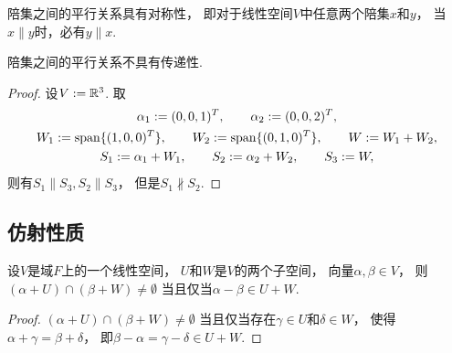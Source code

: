 \begin{property}
陪集之间的平行关系具有对称性，
即对于线性空间\(V\)中任意两个陪集\(x\)和\(y\)，
当\(x \parallel y\)时，必有\(y \parallel x\).
\end{property}

\begin{property}
陪集之间的平行关系不具有传递性.
\begin{proof}
设\(V := \mathbb{R}^3\).
取\begin{gather*}
	\alpha_1 := (0,0,1)^T,
	\qquad
	\alpha_2 := (0,0,2)^T, \\
	W_1 := \operatorname{span}\{(1,0,0)^T\},
	\qquad
	W_2 := \operatorname{span}\{(0,1,0)^T\},
	\qquad
	W := W_1 + W_2, \\
	S_1 := \alpha_1 + W_1,
	\qquad
	S_2 := \alpha_2 + W_2,
	\qquad
	S_3 := W,
\end{gather*}
则有\(
	S_1 \parallel S_3,
	S_2 \parallel S_3
\)，
但是\(S_1 \nparallel S_2\).
\end{proof}
\end{property}

\subsection{仿射性质}
\begin{theorem}\label{theorem:仿射几何.陪集的交非空的充分必要条件1}
设\(V\)是域\(F\)上的一个线性空间，
\(U\)和\(W\)是\(V\)的两个子空间，
向量\(\alpha,\beta \in V\)，
则\((\alpha + U) \cap (\beta + W) \neq \emptyset\)
当且仅当\(\alpha - \beta \in U + W\).
\begin{proof}
\((\alpha + U) \cap (\beta + W) \neq \emptyset\)
当且仅当存在\(\gamma \in U\)和\(\delta \in W\)，
使得\(\alpha + \gamma = \beta + \delta\)，
即\(\beta - \alpha = \gamma - \delta \in U + W\).
\end{proof}
\end{theorem}


